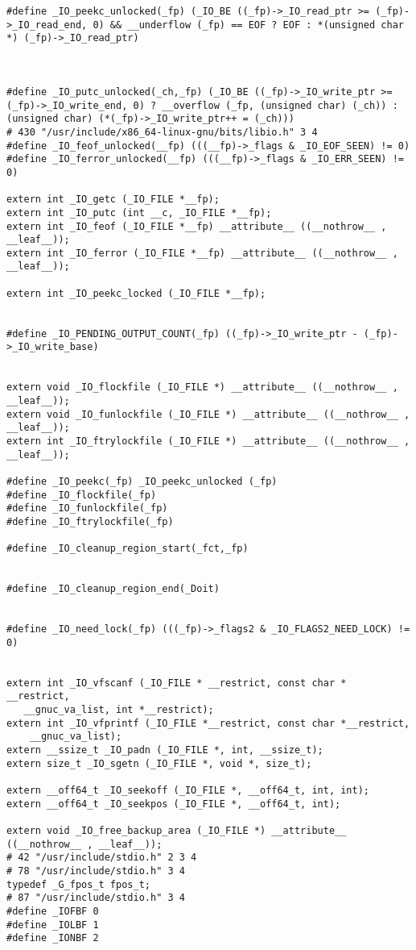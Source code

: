 \documentclass[11pt]{article}
\begin{document}
\begin{verbatim}
#define _IO_peekc_unlocked(_fp) (_IO_BE ((_fp)->_IO_read_ptr >= (_fp)->_IO_read_end, 0) && __underflow (_fp) == EOF ? EOF : *(unsigned char *) (_fp)->_IO_read_ptr)



#define _IO_putc_unlocked(_ch,_fp) (_IO_BE ((_fp)->_IO_write_ptr >= (_fp)->_IO_write_end, 0) ? __overflow (_fp, (unsigned char) (_ch)) : (unsigned char) (*(_fp)->_IO_write_ptr++ = (_ch)))
# 430 "/usr/include/x86_64-linux-gnu/bits/libio.h" 3 4
#define _IO_feof_unlocked(__fp) (((__fp)->_flags & _IO_EOF_SEEN) != 0)
#define _IO_ferror_unlocked(__fp) (((__fp)->_flags & _IO_ERR_SEEN) != 0)

extern int _IO_getc (_IO_FILE *__fp);
extern int _IO_putc (int __c, _IO_FILE *__fp);
extern int _IO_feof (_IO_FILE *__fp) __attribute__ ((__nothrow__ , __leaf__));
extern int _IO_ferror (_IO_FILE *__fp) __attribute__ ((__nothrow__ , __leaf__));

extern int _IO_peekc_locked (_IO_FILE *__fp);


#define _IO_PENDING_OUTPUT_COUNT(_fp) ((_fp)->_IO_write_ptr - (_fp)->_IO_write_base)


extern void _IO_flockfile (_IO_FILE *) __attribute__ ((__nothrow__ , __leaf__));
extern void _IO_funlockfile (_IO_FILE *) __attribute__ ((__nothrow__ , __leaf__));
extern int _IO_ftrylockfile (_IO_FILE *) __attribute__ ((__nothrow__ , __leaf__));

#define _IO_peekc(_fp) _IO_peekc_unlocked (_fp)
#define _IO_flockfile(_fp) 
#define _IO_funlockfile(_fp) 
#define _IO_ftrylockfile(_fp) 

#define _IO_cleanup_region_start(_fct,_fp) 


#define _IO_cleanup_region_end(_Doit) 


#define _IO_need_lock(_fp) (((_fp)->_flags2 & _IO_FLAGS2_NEED_LOCK) != 0)


extern int _IO_vfscanf (_IO_FILE * __restrict, const char * __restrict,
   __gnuc_va_list, int *__restrict);
extern int _IO_vfprintf (_IO_FILE *__restrict, const char *__restrict,
    __gnuc_va_list);
extern __ssize_t _IO_padn (_IO_FILE *, int, __ssize_t);
extern size_t _IO_sgetn (_IO_FILE *, void *, size_t);

extern __off64_t _IO_seekoff (_IO_FILE *, __off64_t, int, int);
extern __off64_t _IO_seekpos (_IO_FILE *, __off64_t, int);

extern void _IO_free_backup_area (_IO_FILE *) __attribute__ ((__nothrow__ , __leaf__));
# 42 "/usr/include/stdio.h" 2 3 4
# 78 "/usr/include/stdio.h" 3 4
typedef _G_fpos_t fpos_t;
# 87 "/usr/include/stdio.h" 3 4
#define _IOFBF 0
#define _IOLBF 1
#define _IONBF 2





\end{verbatim}
\end{document}
